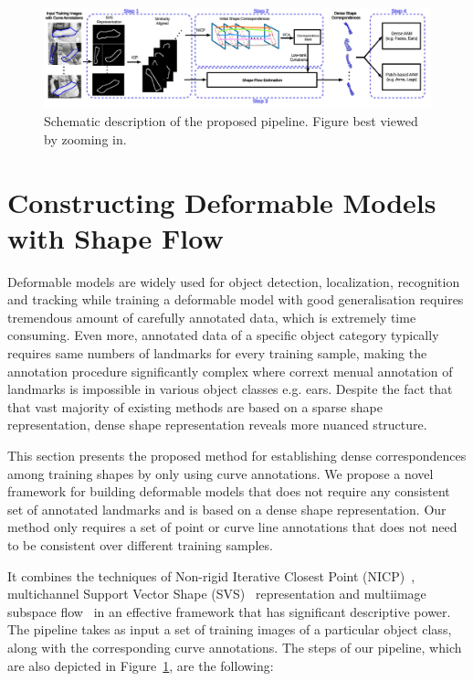 \begin{figure}
    \centering
    \includegraphics[width=\textwidth]{resources/Annotation_Correction/architecture3}
    \caption{Schematic description of the proposed pipeline. Figure best viewed by zooming in.}
    \label{fig:archi}
\end{figure}

\section{Constructing Deformable Models with Shape Flow}

Deformable models are widely used for object detection, localization, recognition and tracking while training a deformable model with good generalisation requires tremendous amount of carefully annotated data, which is extremely time consuming. Even more, annotated data of a specific object category typically requires same numbers of landmarks for every training sample, making the annotation procedure significantly complex where corrext menual annotation of landmarks is impossible in various object classes e.g. ears. Despite the fact that that vast majority of existing methods are based on a sparse shape representation, dense shape representation reveals more nuanced structure.

This section presents the proposed method for establishing dense correspondences among training shapes
by only using curve annotations. We propose a novel framework for building deformable models that does not require any consistent set of annotated landmarks and is based on a dense shape representation. Our method only requires a set of point or curve line annotations that does not need to be consistent over different training samples. 

It combines the techniques of Non-rigid Iterative Closest Point (NICP)~\cite{Amber2007}, multichannel Support Vector Shape (SVS)~\cite{Nguyen2013} representation and multiimage subspace flow~\cite{Garg:2013hu} in an effective framework that has significant descriptive power. The pipeline takes as input a set of training images of a particular object class, along with the corresponding curve annotations. The steps of our pipeline, which are also depicted in Figure~\ref{fig:archi}, are the following:


